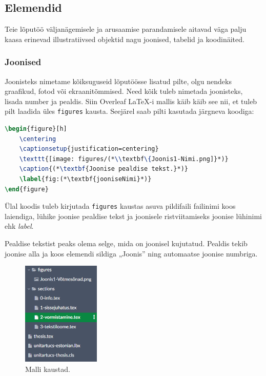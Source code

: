 \subsection{Elemendid}
Teie lõputöö väljanägemisele ja arusaamise parandamisele aitavad väga palju kaasa erinevad illustratiivsed objektid nagu joonised, tabelid ja koodinäited.

\subsubsection{Joonised}
Joonisteks nimetame kõiksuguseid lõputöösse lisatud pilte, olgu nendeks graafikud, fotod või ekraanitõmmised. Need kõik tuleb nimetada joonisteks, lisada number ja pealdis. Siin Overleaf LaTeX-i mallis käib käib see nii, et tuleb pilt laadida üles \verb|figures| kausta. Seejärel saab pilti kasutada järgneva koodiga:

\begin{lstlisting}[language=tex]
\begin{figure}[h]
    \centering
    \captionsetup{justification=centering}
    \texttt{[image: figures/(*\\textbf\{Joonis1-Nimi.png]}*)}
    \caption{(*\textbf{Joonise pealdise tekst.}*)}
    \label{fig:(*\textbf{jooniseNimi}*)}
\end{figure}
\end{lstlisting}

Ülal koodis tuleb kirjutada \verb|figures| kaustas asuva pildifaili failinimi koos laiendiga, lühike joonise pealdise tekst ja joonisele ristviitamiseks joonise lühinimi ehk \emph{label}.

Pealdise tekstist peaks olema selge, mida on joonisel kujutatud. Pealdis tekib joonise alla ja koos elemendi sildiga „Joonis” ning automaatse joonise numbriga.

\begin{figure}
    \centering
    \captionsetup{justification=centering}
    \includegraphics[width=0.33\textwidth]{figures/Joonis2-FiguresKaust.png}
    \caption{Malli kaustad.}
    \label{fig:folders}
\end{figure}

